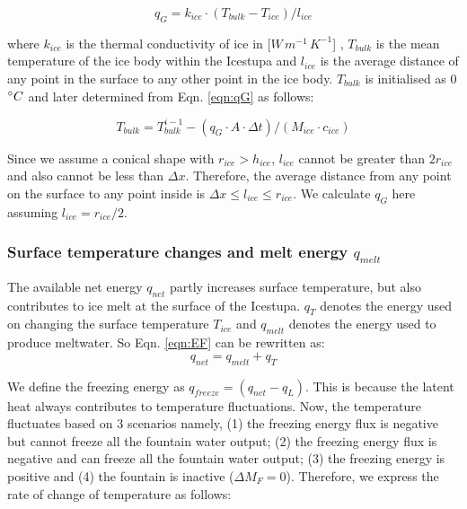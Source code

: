 \documentclass[utf8]{frontiersSCNS} %
\begin{document}
\begin{equation} q_{G} = k_{ice} \cdot (T_{bulk}-T_{ice})/l_{ice} \label{eqn:qG}    \end{equation}

where $k_{ice}$ is the thermal conductivity of ice in [$W\, m^{-1}\,K^{-1}$] , $T_{bulk}$ is the mean temperature of
the ice body within the Icestupa and $l_{ice}$ is the average distance of any point in the surface to any other point
in the ice body. $T_{bulk}$ is initialised as 0 $\degree C$ and later determined from Eqn. \ref{eqn:qG} as follows:

\begin{equation} T_{bulk} = T_{bulk}^{i-1} - (q_{G} \cdot A \cdot \Delta t)/(M_{ice} \cdot c_{ice}) \end{equation}

Since we assume a conical shape with $r_{ice} > h_{ice}$, $l_{ice}$ cannot be greater than $2r_{ice}$ and also cannot
be less than $\Delta x$. Therefore, the average distance from any point on the surface to any point inside is $\Delta
x \leq l_{ice} \leq r_{ice}$. We calculate $q_{G}$ here assuming $l_{ice} = r_{ice}/2$.


\subsubsection{Surface temperature changes and melt energy $q_{melt}$}
The available net energy $q_{net}$ partly increases surface temperature, but also contributes to ice melt at the
surface of the Icestupa. $q_{T}$ denotes the energy used on changing the surface temperature $T_{ice}$ and $q_{melt}$
denotes the energy used to produce meltwater. So Eqn. \ref{eqn:EF} can be rewritten as: \begin{equation} q_{net} =
q_{melt} + q_{T} \end{equation}

We define the freezing energy as $q_{freeze} = (q_{net}-q_{L})$. This is because the latent heat always contributes to
temperature fluctuations. Now, the temperature fluctuates based on 3 scenarios namely, (1) the freezing energy flux is
negative but cannot freeze all the fountain water output; (2) the freezing energy flux is negative and can freeze all
the fountain water output; (3) the freezing energy is positive and (4) the fountain is inactive ($\Delta M_{F}=0$).
Therefore, we express the rate of change of temperature as follows:
\end{document}
